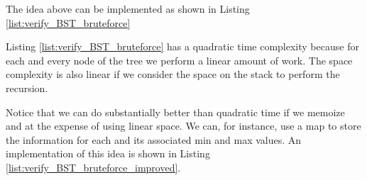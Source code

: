 The idea above can be implemented as shown in Listing \ref{list:verify_BST_bruteforce}



Listing \ref{list:verify_BST_bruteforce} has a quadratic time complexity because for each and every node of the tree we perform a linear amount of work. The space complexity is also linear if we consider the space on the stack to perform the recursion.


Notice that we can do substantially better than quadratic time if we memoize  and  at the expense of using linear space. We can, for instance, use a map to store the information for each  and its associated min and max values. An implementation of this idea is shown in Listing \ref{list:verify_BST_bruteforce_improved}.

